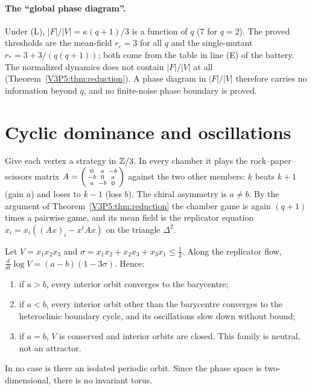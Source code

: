 \paragraph{The ``global phase diagram''.} Under (L), $|F|/|V|=\kappa(q+1)/3$ is a function of
$q$ ($7$ for $q=2$). The proved thresholds are the mean-field $r_c=3$ for all $q$ and the
single-mutant $r_*=3+3/(q(q+1))$; both come from the table in line (E) of the battery. The
normalized dynamics does not contain $|F|/|V|$ at all (Theorem~\ref{V3P5:thm:reduction}). A
phase diagram in $|F|/|V|$ therefore carries no information beyond $q$, and no finite-noise
phase boundary is proved.

\section{Cyclic dominance and oscillations}\label{V3P5:sec:rps}

Give each vertex a strategy in $\mathbb{Z}/3$. In every chamber it plays the rock--paper--scissors
matrix $A=\begin{psmallmatrix}0&a&-b\\-b&0&a\\a&-b&0\end{psmallmatrix}$ against the two other
members: $k$ beats $k+1$ (gain $a$) and loses to $k-1$ (loss $b$). The chiral asymmetry is
$a\ne b$. By the argument of Theorem~\ref{V3P5:thm:reduction} the chamber game is again
$(q+1)$ times a pairwise game, and its mean field is the replicator equation
$\dot x_i=x_i((Ax)_i-x^{t}Ax)$ on the triangle $\Delta^{2}$.

\begin{theorem}\label{V3P5:thm:rps}
Let $V=x_1x_2x_3$ and $\sigma=x_1x_2+x_2x_3+x_3x_1\le\frac13$. Along the replicator flow,
$\frac{d}{dt}\log V=(a-b)(1-3\sigma)$. Hence:
\begin{enumerate}
\item[(i)] if $a>b$, every interior orbit converges to the barycentre;
\item[(ii)] if $a<b$, every interior orbit other than the barycentre converges to the
heteroclinic boundary cycle, and its oscillations slow down without bound;
\item[(iii)] if $a=b$, $V$ is conserved and interior orbits are closed. This family is neutral,
not an attractor.
\end{enumerate}
In no case is there an isolated periodic orbit. Since the phase space is two-dimensional, there
is no invariant torus.
\end{theorem}

